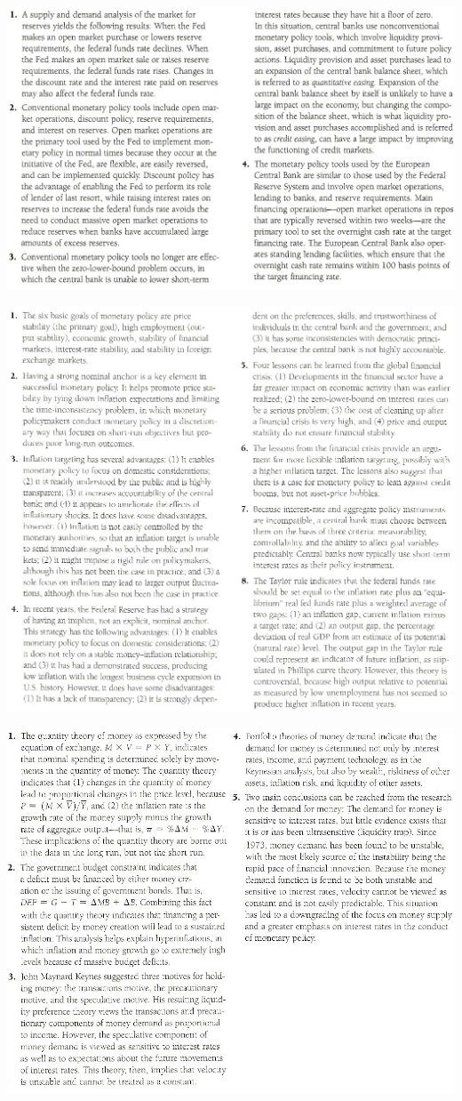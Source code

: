 \documentclass[12pt]{examnotes}
\begin{document}
\includegraphics[scale=0.45]{./imgs/sum16.jpg}

\includegraphics[scale=0.5]{./imgs/sum17.jpg}

\includegraphics[scale=0.45]{./imgs/sum20.jpg}
\end{document}
